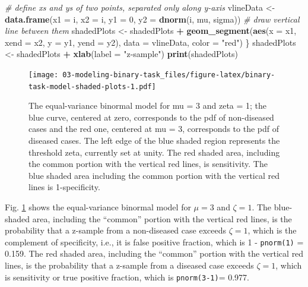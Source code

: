 \documentclass[
]{book}
\newenvironment{Shaded}{\begin{snugshade}}{\end{snugshade}}
\newcommand{\CommentTok}[1]{\textcolor[rgb]{0.56,0.35,0.01}{\textit{#1}}}
\newcommand{\DataTypeTok}[1]{\textcolor[rgb]{0.13,0.29,0.53}{#1}}
\newcommand{\DecValTok}[1]{\textcolor[rgb]{0.00,0.00,0.81}{#1}}
\newcommand{\KeywordTok}[1]{\textcolor[rgb]{0.13,0.29,0.53}{\textbf{#1}}}
\newcommand{\NormalTok}[1]{#1}
\newcommand{\OperatorTok}[1]{\textcolor[rgb]{0.81,0.36,0.00}{\textbf{#1}}}
\newcommand{\StringTok}[1]{\textcolor[rgb]{0.31,0.60,0.02}{#1}}
\begin{document}
\begin{Shaded}
\begin{Highlighting}[]
  \CommentTok{# define xs and ys of two points, separated only along y-axis}
\NormalTok{  vlineData <-}\StringTok{ }\KeywordTok{data.frame}\NormalTok{(}\DataTypeTok{x1 =}\NormalTok{ i, }
                          \DataTypeTok{x2 =}\NormalTok{ i, }
                          \DataTypeTok{y1 =} \DecValTok{0}\NormalTok{, }
                          \DataTypeTok{y2 =} \KeywordTok{dnorm}\NormalTok{(i, mu, sigma))}
  \CommentTok{# draw vertical line between them}
\NormalTok{  shadedPlots <-}\StringTok{ }\NormalTok{shadedPlots }\OperatorTok{+}\StringTok{ }
\StringTok{    }\KeywordTok{geom_segment}\NormalTok{(}\KeywordTok{aes}\NormalTok{(}\DataTypeTok{x =}\NormalTok{ x1, }\DataTypeTok{xend =}\NormalTok{ x2, }\DataTypeTok{y =}\NormalTok{ y1, }\DataTypeTok{yend =}\NormalTok{ y2), }
                 \DataTypeTok{data =}\NormalTok{ vlineData, }\DataTypeTok{color =} \StringTok{"red"}\NormalTok{)}
\NormalTok{\}}
\NormalTok{shadedPlots <-}\StringTok{ }\NormalTok{shadedPlots }\OperatorTok{+}\StringTok{ }\KeywordTok{xlab}\NormalTok{(}\DataTypeTok{label =} \StringTok{"z-sample"}\NormalTok{)}
\KeywordTok{print}\NormalTok{(shadedPlots)}
\end{Highlighting}
\end{Shaded}

\begin{figure}
\centering
\texttt{[image: 03-modeling-binary-task\_files/figure-latex/binary-task-model-shaded-plots-1.pdf]}
\caption{\label{fig:binary-task-model-shaded-plots}The equal-variance binormal model for mu = 3 and zeta = 1; the blue curve, centered at zero, corresponds to the pdf of non-diseased cases and the red one, centered at mu = 3, corresponds to the pdf of diseased cases. The left edge of the blue shaded region represents the threshold zeta, currently set at unity. The red shaded area, including the common portion with the vertical red lines, is sensitivity. The blue shaded area including the common portion with the vertical red lines is 1-specificity.}
\end{figure}

Fig. \ref{fig:binary-task-model-shaded-plots} shows the equal-variance binormal model for \(\mu = 3\) and \(\zeta = 1\). The blue-shaded area, including the ``common'' portion with the vertical red lines, is the probability that a z-sample from a non-diseased case exceeds \(\zeta = 1\), which is the complement of specificity, i.e., it is false positive fraction, which is 1 - \texttt{pnorm(1)} = 0.159. The red shaded area, including the ``common'' portion with the vertical red lines, is the probability that a z-sample from a diseased case exceeds \(\zeta = 1\), which is sensitivity or true positive fraction, which is \texttt{pnorm(3-1)}= 0.977.
\end{document}
